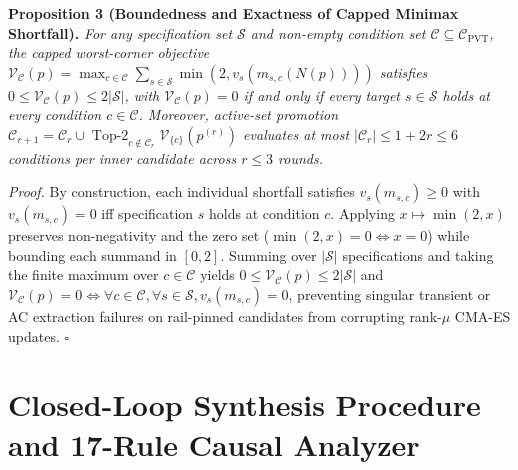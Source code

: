 \textbf{Proposition 3 (Boundedness and Exactness of Capped Minimax Shortfall).} \emph{For any specification set $\mathcal{S}$ and non-empty condition set $\mathcal{C} \subseteq \mathcal{C}_{\text{PVT}}$, the capped worst-corner objective $\mathcal{V}_{\mathcal{C}}(p) = \max_{c \in \mathcal{C}} \sum_{s \in \mathcal{S}} \min(2, v_s(m_{s,c}(N(p))))$ satisfies $0 \le \mathcal{V}_{\mathcal{C}}(p) \le 2|\mathcal{S}|$, with $\mathcal{V}_{\mathcal{C}}(p) = 0$ if and only if every target $s \in \mathcal{S}$ holds at every condition $c \in \mathcal{C}$. Moreover, active-set promotion $\mathcal{C}_{r+1} = \mathcal{C}_r \cup \operatorname{Top-2}_{c \notin \mathcal{C}_r} \mathcal{V}_{\{c\}}(p^{(r)})$ evaluates at most $|\mathcal{C}_r| \le 1 + 2r \le 6$ conditions per inner candidate across $r \le 3$ rounds.}

\emph{Proof.} By construction, each individual shortfall satisfies $v_s(m_{s,c}) \ge 0$ with $v_s(m_{s,c}) = 0$ iff specification $s$ holds at condition $c$. Applying $x \mapsto \min(2, x)$ preserves non-negativity and the zero set ($\min(2, x) = 0 \iff x = 0$) while bounding each summand in $[0, 2]$. Summing over $|\mathcal{S}|$ specifications and taking the finite maximum over $c \in \mathcal{C}$ yields $0 \le \mathcal{V}_{\mathcal{C}}(p) \le 2|\mathcal{S}|$ and $\mathcal{V}_{\mathcal{C}}(p) = 0 \iff \forall c \in \mathcal{C}, \forall s \in \mathcal{S}, v_s(m_{s,c}) = 0$, preventing singular transient or AC extraction failures on rail-pinned candidates from corrupting rank-$\mu$ CMA-ES updates. \hfill $\square$

\section{Closed-Loop Synthesis Procedure and 17-Rule Causal Analyzer}
\label{app:algo}


